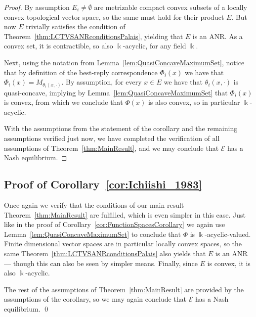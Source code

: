 \documentclass[a4paper,11pt,reqno,english]{amsart}
\theoremstyle{definition}
\begin{document}
\begin{proof}
	By assumption $E_i\neq \emptyset$ are metrizable compact convex subsets of a locally convex topological vector space, so the same must hold for their product $E$. But now $E$ trivially satisfies the condition of Theorem~\ref{thm:LCTVSANRconditionsPalais}, yielding that $E$ is an ANR. As a convex set, it is contractible, so also $\Bbbk$-acyclic, for any field $\Bbbk$.

	Next, using the notation from Lemma~\ref{lem:QuasiConcaveMaximumSet}, notice that by definition of the best-reply correspondence $\Phi_i(x)$ we have that $\Phi_i(x) = M_{\theta_i(x,\cdot)}$. By assumption, for every $x\in E$ we have that $\theta_i(x, \cdot)$ is quasi-concave, implying by Lemma~\ref{lem:QuasiConcaveMaximumSet} that $\Phi_i(x)$ is convex, from which we conclude that $\Phi(x)$ is also convex, so in particular $\Bbbk$-acyclic.

	With the assumptions from the statement of the corollary and the remaining assumptions verified just now, we have completed the verification of all assumptions of Theorem~\ref{thm:MainResult}, and we may conclude that $\mathcal{E}$ has a Nash equilibrium.
\end{proof}


\subsection{Proof of Corollary~\ref{cor:Ichiishi_1983}}

Once again we verify that the conditions of our main result Theorem~\ref{thm:MainResult} are fulfilled, which is even simpler in this case.
Just like in the proof of Corollary~\ref{cor:FunctionSpacesCorollary} we again use Lemma~\ref{lem:QuasiConcaveMaximumSet} to conclude that $\Phi$ is $\Bbbk$-acyclic-valued. Finite dimensional vector spaces are in particular locally convex spaces, so the same Theorem~\ref{thm:LCTVSANRconditionsPalais} also yields that $E$ is an ANR --- though this can also be seen by simpler means. Finally, since $E$ is convex, it is also $\Bbbk$-acyclic.

The rest of the assumptions of Theorem~\ref{thm:MainResult} are provided by the assumptions of the corollary, so we may again conclude that $\mathcal{E}$ has a Nash equilibrium.
\qed
\end{document}
